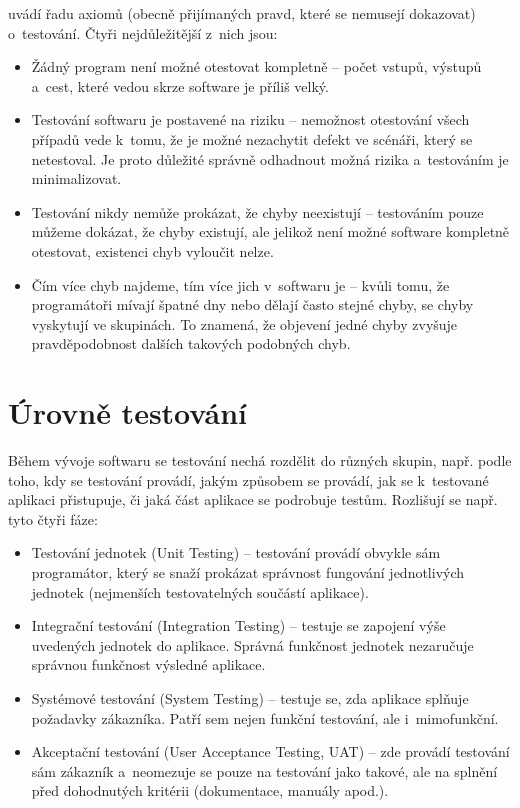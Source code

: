 	\citep{Patton} uvádí řadu axiomů (obecně přijímaných pravd, které se nemusejí dokazovat) o~testování. Čtyři nejdůležitější z~nich jsou:
		\begin{itemize}
			\item Žádný program není možné otestovat kompletně -- počet vstupů, výstupů a~cest, které vedou skrze software je příliš velký.
			\item Testování softwaru je postavené na riziku -- nemožnost otestování všech případů vede k~tomu, že je možné nezachytit defekt ve scénáři, který se netestoval. Je proto důležité správně odhadnout možná rizika a~testováním je minimalizovat.
			\item Testování nikdy nemůže prokázat, že chyby neexistují -- testováním pouze můžeme dokázat, že chyby existují, ale jelikož není možné software kompletně otestovat, existenci chyb vyloučit nelze.
			\item Čím více chyb najdeme, tím více jich v~softwaru je -- kvůli tomu, že programátoři mívají špatné dny nebo dělají často stejné chyby, se chyby vyskytují ve skupinách. To znamená, že objevení jedné chyby zvyšuje pravděpodobnost dalších takových podobných chyb.
		\end{itemize}
		
		\section{Úrovně testování}
		Během vývoje softwaru se testování nechá rozdělit do různých skupin, např. podle toho, kdy se testování provádí, jakým způsobem se provádí, jak se k~testované aplikaci přistupuje, či jaká část aplikace se podrobuje testům. Rozlišují se např. tyto čtyři fáze:
			\begin{itemize}
				\item Testování jednotek (Unit Testing) -- testování provádí obvykle sám programátor, který se snaží prokázat správnost fungování jednotlivých jednotek (nejmenších testovatelných součástí aplikace).
				\item Integrační testování (Integration Testing) -- testuje se zapojení výše uvedených jednotek do aplikace. Správná funkčnost jednotek nezaručuje správnou funkčnost výsledné aplikace.
				\item Systémové testování (System Testing) -- testuje se, zda aplikace splňuje požadavky zákazníka. Patří sem nejen funkční testování, ale i~mimofunkční.
				\item Akceptační testování (User Acceptance Testing, UAT) -- zde provádí testování sám zákazník a~neomezuje se pouze na testování jako takové, ale na splnění před dohodnutých kritérii (dokumentace, manuály apod.).
			\end{itemize}
			
